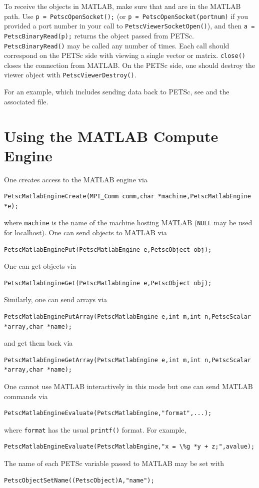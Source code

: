 To receive the objects in MATLAB, make sure that  and 
are in the MATLAB path. Use \break\lstinline{p = PetscOpenSocket();} (or \lstinline{p = PetscOpenSocket(portnum)} if you provided a port number in
your call to \lstinline{PetscViewerSocketOpen()}), and then \lstinline{a = PetscBinaryRead(p);} returns the object passed from PETSc.
\lstinline{PetscBinaryRead()} may be called any number of times. Each call should correspond on the PETSc side with
viewing a single vector or matrix. \lstinline{close()} closes the connection from MATLAB.
On the PETSc side, one should destroy the viewer object with \lstinline{PetscViewerDestroy()}.

For an example, which includes sending data back to PETSc, see \href{https://www.mcs.anl.gov/petsc/petsc-current/src/vec/vec/tutorials/ex42.c.html}{} and the associated  file.

\section{Using the MATLAB Compute Engine}
\label{sec_matlabengine}

One creates access to the MATLAB engine via
\begin{lstlisting}
PetscMatlabEngineCreate(MPI_Comm comm,char *machine,PetscMatlabEngine *e);
\end{lstlisting}
where \lstinline{machine} is the name of the machine hosting MATLAB (\lstinline{NULL} may be used for localhost).
One can send objects to MATLAB via
\begin{lstlisting}
PetscMatlabEnginePut(PetscMatlabEngine e,PetscObject obj);
\end{lstlisting}
One can get objects
via
\begin{lstlisting}
PetscMatlabEngineGet(PetscMatlabEngine e,PetscObject obj);
\end{lstlisting}
Similarly, one can send arrays via
\begin{lstlisting}
PetscMatlabEnginePutArray(PetscMatlabEngine e,int m,int n,PetscScalar *array,char *name);
\end{lstlisting}
and get them back via
\begin{lstlisting}
PetscMatlabEngineGetArray(PetscMatlabEngine e,int m,int n,PetscScalar *array,char *name);
\end{lstlisting}
One cannot use MATLAB
interactively in this mode but one can send MATLAB commands via
\begin{lstlisting}
PetscMatlabEngineEvaluate(PetscMatlabEngine,"format",...);
\end{lstlisting}
where \lstinline{format} has the usual \lstinline{printf()} format.
For example,
\begin{lstlisting}
PetscMatlabEngineEvaluate(PetscMatlabEngine,"x = \%g *y + z;",avalue);
\end{lstlisting}
The name of each PETSc variable passed to MATLAB may be set with
\begin{lstlisting}
PetscObjectSetName((PetscObject)A,"name");
\end{lstlisting}

